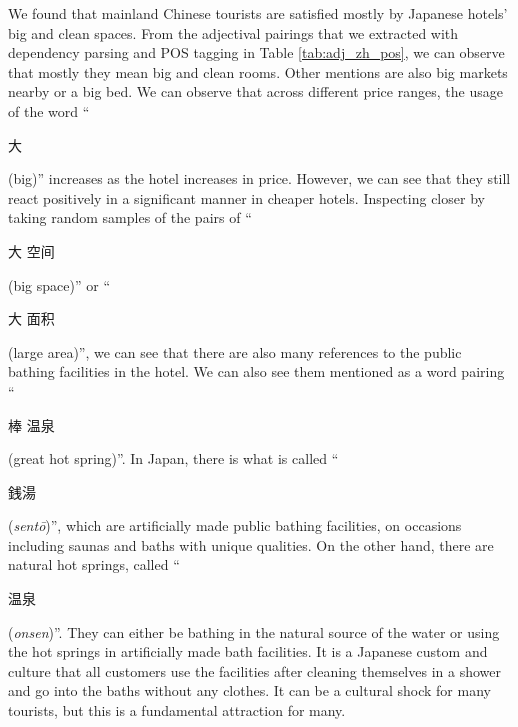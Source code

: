 \documentclass[smallextended,natbib]{svjour3}       %
\begin{document}
    We found that mainland Chinese tourists are satisfied mostly by Japanese hotels' big and clean spaces. From the adjectival pairings that we extracted with dependency parsing and POS tagging in Table \ref{tab:adj_zh_pos}, we can observe that mostly they mean big and clean rooms. Other mentions are also big markets nearby or a big bed. We can observe that across different price ranges, the usage of the word ``\begin{CJK}{UTF8}{gbsn}大\end{CJK} (big)'' increases as the hotel increases in price. However, we can see that they still react positively in a significant manner in cheaper hotels. Inspecting closer by taking random samples of the pairs of ``\begin{CJK}{UTF8}{gbsn}大 空间\end{CJK} (big space)'' or ``\begin{CJK}{UTF8}{gbsn}大 面积\end{CJK} (large area)'', we can see that there are also many references to the public bathing facilities in the hotel. We can also see them mentioned as a word pairing ``\begin{CJK}{UTF8}{gbsn}棒 温泉\end{CJK} (great hot spring)''. In Japan, there is what is called ``\begin{CJK}{UTF8}{min}銭湯\end{CJK} (\textit{sent\=o})'', which are artificially made public bathing facilities, on occasions including saunas and baths with unique qualities. On the other hand, there are natural hot springs, called ``\begin{CJK}{UTF8}{gbsn}温泉\end{CJK} (\textit{onsen})''. They can either be bathing in the natural source of the water or using the hot springs in artificially made bath facilities. It is a Japanese custom and culture that all customers use the facilities after cleaning themselves in a shower and go into the baths without any clothes. It can be a cultural shock for many tourists, but this is a fundamental attraction for many. 
\end{document}
